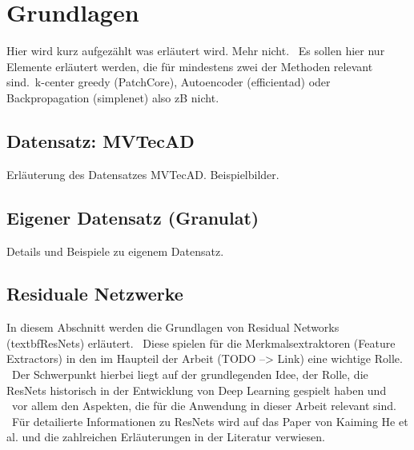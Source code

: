 
\chapter{Grundlagen}\label{ch:Grundlagen}
Hier wird kurz aufgezählt was erläutert wird. Mehr nicht. \
Es sollen hier nur Elemente erläutert werden, die für mindestens zwei der Methoden relevant sind.\
k-center greedy (PatchCore), Autoencoder (efficientad) oder Backpropagation (simplenet) also zB nicht.\

\section{Datensatz: MVTecAD}\label{sec:DatensatzMVTecAD}
Erläuterung des Datensatzes MVTecAD. Beispielbilder.

\section{Eigener Datensatz (Granulat)}\label{sec:EigenerDatensatz}
Details und Beispiele zu eigenem Datensatz.

\section{Residuale Netzwerke}\label{sec:ResidualNetworks}
In diesem Abschnitt werden die Grundlagen von Residual Networks (textbf{\glqq ResNets\grqq{}}) erläutert. \
Diese spielen für die Merkmalsextraktoren (\glqq Feature Extractors\grqq{}) in den im Haupteil der Arbeit (TODO --> Link) eine wichtige Rolle. \
Der Schwerpunkt hierbei liegt auf der grundlegenden Idee, der Rolle, die ResNets historisch in der Entwicklung von Deep Learning gespielt haben und \
vor allem den Aspekten, die für die Anwendung in dieser Arbeit relevant sind. \ 
Für detailierte Informationen zu ResNets wird auf das Paper von Kaiming He et al. \cite{resnet} und die zahlreichen Erläuterungen in der Literatur verwiesen. \
